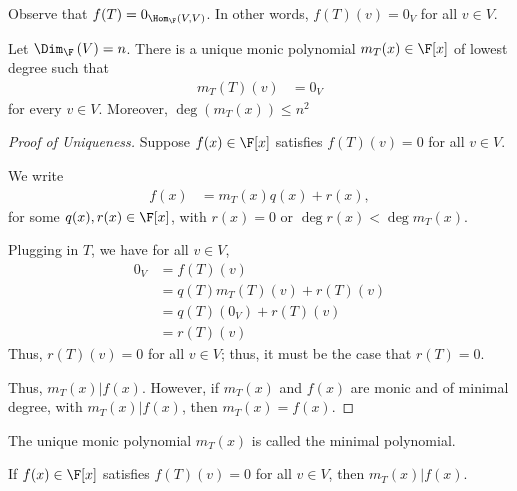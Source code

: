 \documentclass[10pt]{mypackage}
\begin{document}
Observe that $f(T) = 0_{\Hom_{\F}\left(V,V\right)}$. In other words, $f\left(T\right)\left(v\right) = 0_V$ for all $v\in V$.
\begin{theorem}
  Let $\Dim_{\F}\left(V\right) = n$. There is a unique monic polynomial $m_T(x) \in \F[x]$ of lowest degree such that
  \begin{align*}
    m_T\left(T\right)\left(v\right) &= 0_V
  \end{align*}
  for every $v\in V$. Moreover, $\deg\left( m_T\left(x\right)\right)\leq n^2$
\end{theorem}
\begin{proof}[Proof of Uniqueness]
  Suppose $f(x) \in \F[x]$ satisfies $f(T)(v) = 0$ for all $v\in V$.\newline

  We write
  \begin{align*}
    f(x) &= m_T\left(x\right)q(x) + r(x),
  \end{align*}
  for some $q(x),r(x) \in \F[x]$, with $r(x) = 0$ or $\deg r(x) < \deg m_T(x)$.\newline

  Plugging in $T$, we have for all $v\in V$,
  \begin{align*}
    0_V &= f(T)(v)\\
        &= q(T)m_T(T)(v) + r(T)(v)\\
        &= q(T)\left(0_V\right) + r(T)(v)\\
        &= r(T)(v)
  \end{align*}
  Thus, $r(T) (v) = 0$ for all $v\in V$; thus, it must be the case that $r(T) = 0$.\newline

  Thus, $m_T(x)|f(x)$. However, if $m_T(x)$ and $f(x)$ are monic and of minimal degree, with $m_T(x)|f(x)$, then $m_T(x) = f(x)$.
\end{proof}
\begin{definition}
  The unique monic polynomial $m_T(x)$ is called the minimal polynomial.
\end{definition}
\begin{corollary}
  If $f(x)\in \F[x]$ satisfies $f(T)(v) = 0$ for all $v\in V$, then $m_T(x)|f(x)$.
\end{corollary}
\end{document}
